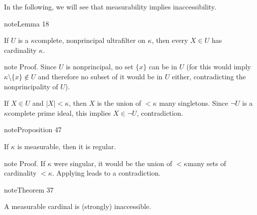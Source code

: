 \documentclass[letterpaper,10pt,english]{jupyterBook}
\begin{document}
\sphinxAtStartPar
In the following, we will see that measurability implies inaccessibility.
\label{large_cardinals:lem-cardinality-kappa-ultrafilter}
\begin{sphinxadmonition}{note}{Lemma 18}



\sphinxAtStartPar
If \(U\) is a \(\kappa\)\sphinxhyphen{}complete, non\sphinxhyphen{}principal ultrafilter on \(\kappa\), then every \(X \in U\) has cardinality \(\kappa\).
\end{sphinxadmonition}

\begin{sphinxadmonition}{note}
\sphinxAtStartPar
Proof. Since \(U\) is non\sphinxhyphen{}principal, no  set \(\{x\}\) can be in \(U\) (for this would imply \(\kappa\setminus \{x\} \notin U\) and therefore no subset of it would be in \(U\) either, contradicting the non\sphinxhyphen{}principality of \(U\)).

\sphinxAtStartPar
If \(X \in U\) and \(|X| < \kappa\), then \(X\) is the union of \(< \kappa\) many singletons. Since \(\neg U\) is a \(\kappa\)\sphinxhyphen{}complete prime ideal, this implies \(X \in \neg U\), contradiction.
\end{sphinxadmonition}
\label{large_cardinals:prop-measurable-regular}
\begin{sphinxadmonition}{note}{Proposition 47}



\sphinxAtStartPar
If \(\kappa\) is measurable, then it is regular.
\end{sphinxadmonition}

\begin{sphinxadmonition}{note}
\sphinxAtStartPar
Proof. If \(\kappa\) were singular, it would be the union of \(<\kappa\)\sphinxhyphen{}many sets of cardinality \(<\kappa\). Applying {\hyperref[\detokenize{large_cardinals:lem-cardinality-kappa-ultrafilter}]{}} leads to a contradiction.
\end{sphinxadmonition}
\label{large_cardinals:thm-measurable-inaccessible}
\begin{sphinxadmonition}{note}{Theorem 37}



\sphinxAtStartPar
A measurable cardinal is (strongly) inaccessible.
\end{sphinxadmonition}
\end{document}
